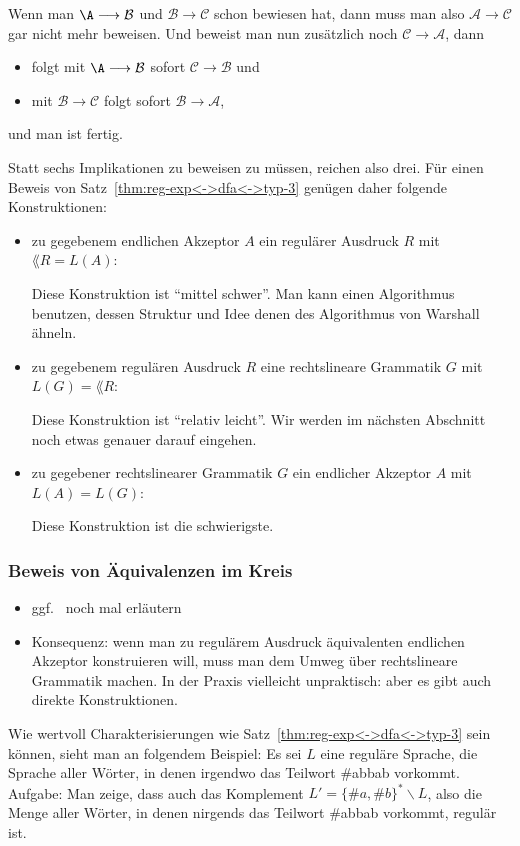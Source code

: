 Wenn man $\A \longrightarrow \mathcal{B}$ und $\mathcal{B} \longrightarrow \mathcal{C}$ schon
bewiesen hat, dann muss man also $\mathcal{A} \longrightarrow \mathcal{C}$ gar
nicht mehr beweisen.  Und beweist man nun zusätzlich noch $\mathcal{C}
\longrightarrow \mathcal{A}$, dann
\begin{itemize}
\item folgt mit $\A \longrightarrow \mathcal{B}$ sofort $\mathcal{C} \longrightarrow
  \mathcal{B}$ und
\item mit $\mathcal{B} \longrightarrow \mathcal{C}$ folgt sofort
  $\mathcal{B} \longrightarrow \mathcal{A}$,
\end{itemize}
und man ist fertig.

Statt sechs Implikationen zu beweisen zu müssen, reichen also
drei. Für einen Beweis von Satz~\ref{thm:reg-exp<->dfa<->typ-3}
genügen daher folgende Konstruktionen:
\begin{itemize}
\item zu gegebenem endlichen Akzeptor $A$ ein regulärer Ausdruck $R$
  mit $\lang{R}=L(A)$:

  Diese Konstruktion ist "`mittel schwer"'. Man kann \zB einen
  Algorithmus benutzen, dessen Struktur und Idee denen des Algorithmus
  von Warshall ähneln.
\item zu gegebenem regulären Ausdruck $R$ eine rechtslineare Grammatik
  $G$ mit $L(G)=\lang{R}$:

  Diese Konstruktion ist "`relativ leicht"'. Wir werden im nächsten
  Abschnitt noch etwas genauer darauf eingehen.
\item zu gegebener rechtslinearer Grammatik $G$ ein endlicher Akzeptor
  $A$ mit $L(A)=L(G)$:

  Diese Konstruktion ist die schwierigste.
\end{itemize}

\begin{tutorium}
  \subsubsection*{Beweis von Äquivalenzen im Kreis}
  \begin{itemize}
  \item ggf.~ noch mal erläutern
  \item Konsequenz: wenn man \zB zu regulärem Ausdruck äquivalenten
    endlichen Akzeptor konstruieren will, muss man dem Umweg über
    rechtslineare Grammatik machen. In der Praxis vielleicht
    unpraktisch: aber es gibt auch direkte Konstruktionen.
  \end{itemize}
\end{tutorium}
%
Wie wertvoll Charakterisierungen wie
Satz~\ref{thm:reg-exp<->dfa<->typ-3} sein können, sieht man an
folgendem Beispiel: Es sei $L$ eine reguläre Sprache, \zB die Sprache
aller Wörter, in denen irgendwo das Teilwort \#{abbab}
vorkommt. Aufgabe: Man zeige, dass auch das Komplement
$L'=\{\#a,\#b\}^*\smallsetminus L$, also die Menge aller Wörter,
in denen nirgends das Teilwort \#{abbab} vorkommt, regulär ist.

